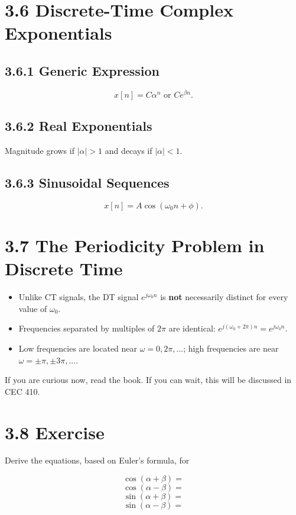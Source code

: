 \documentclass[11pt]{article}
\begin{document}
\section*{3.6 Discrete-Time Complex Exponentials}

\subsection*{3.6.1 Generic Expression}

\[x[n] = C\alpha^n \text{ or } C e^{\beta n}.\]

\subsection*{3.6.2 Real Exponentials}

Magnitude grows if $|\alpha| > 1$ and decays if $|\alpha| < 1$.

\subsection*{3.6.3 Sinusoidal Sequences}

\[x[n] = A\cos(\omega_0 n + \phi).\]

\section*{3.7 The Periodicity Problem in Discrete Time}

\begin{itemize}
  \item Unlike CT signals, the DT signal $e^{j\omega_0 n}$ is \textbf{not} necessarily distinct for every value of $\omega_0$.
  \item Frequencies separated by multiples of $2\pi$ are identical: $e^{j(\omega_0 + 2\pi)n} = e^{j\omega_0 n}$.
  \item Low frequencies are located near $\omega = 0, 2\pi, ...$; high frequencies are near $\omega = \pm\pi, \pm 3\pi, ...$.
\end{itemize}

If you are curious now, read the book. If you can wait, this will be discussed in CEC 410.

\section*{3.8 Exercise}

Derive the equations, based on Euler's formula, for

\[\cos(\alpha + \beta) =\]
\[\cos(\alpha - \beta) =\]
\[\sin(\alpha + \beta) =\]
\[\sin(\alpha - \beta) =\]
\end{document}
